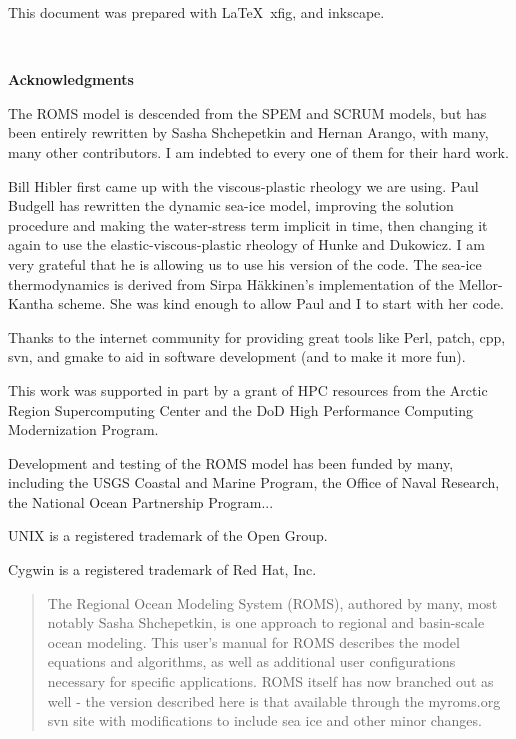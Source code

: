 \setcounter{page}{0}
This document was prepared with \LaTeX\, xfig, and inkscape.

\mbox{  }
\begin{center}
\bf \LARGE Acknowledgments
\end{center}

The ROMS model is descended from the SPEM and SCRUM models, but has
been entirely rewritten by Sasha Shchepetkin and Hernan Arango, with
many, many other contributors. I am indebted to every one of them
for their hard work.

Bill Hibler first came up with the viscous-plastic rheology we are
using. Paul Budgell has rewritten the dynamic sea-ice model, improving
the solution procedure and making the water-stress term implicit in time,
then changing it again to use the elastic-viscous-plastic rheology of
Hunke and Dukowicz. I am very grateful that he is allowing us to use
his version of the code. The sea-ice thermodynamics is derived from
Sirpa H\"akkinen's implementation of the Mellor-Kantha scheme. She was
kind enough to allow Paul and I to start with her code.

Thanks to the internet community for providing great tools like Perl,
patch, cpp, svn, and gmake to aid in software development (and to make
it more fun).

This work was supported in part by a grant of HPC resources from the
Arctic Region Supercomputing Center and the DoD High Performance
Computing Modernization Program.

Development and testing of the ROMS model has been funded by many,
including the USGS Coastal and Marine Program, the Office of Naval
Research, the National Ocean Partnership Program...

\vspace{\fill}
UNIX is a registered trademark of the Open Group.

Cygwin is a registered trademark of Red Hat, Inc.


\vfil\break
\begin{abstract}
The Regional Ocean Modeling System (ROMS), authored by many, most
notably Sasha Shchepetkin, is one approach to regional and basin-scale ocean
modeling. This user's manual for ROMS describes the model equations
and algorithms, as well as additional user configurations necessary
for specific applications. ROMS itself has now branched out as
well - the version described here is that available through the
myroms.org svn site with modifications to include sea ice and other
minor changes.

\end{abstract}
